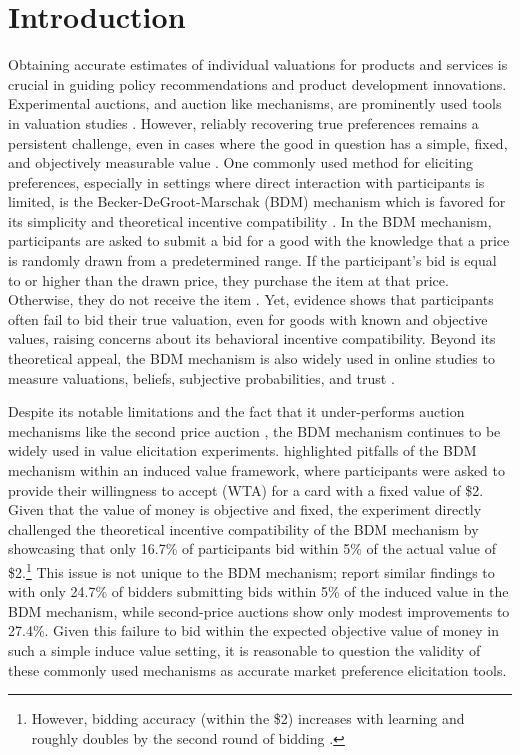 \documentclass[12pt]{article}
\begin{document}
\section{Introduction}
Obtaining accurate estimates of individual valuations for products and services is crucial in guiding policy recommendations and product development innovations. Experimental auctions, and auction like mechanisms, are prominently used tools in valuation studies \citep{lusk2007experimental,canavari2019run}. However, reliably recovering true preferences remains a persistent challenge, even in cases where the good in question has a simple, fixed, and objectively measurable value \citep{drichoutis2022game, cason_misconceptions_2014}. One commonly used method for eliciting preferences, especially in settings where direct interaction with participants is limited, is the Becker-DeGroot-Marschak (BDM) mechanism which is favored for its simplicity and theoretical incentive compatibility \citep{mamadehussene2023reliability, azrieli2018incentives}. In the BDM mechanism, participants are asked to submit a bid for a good with the knowledge that a price is randomly drawn from a predetermined range. If the participant's bid is equal to or higher than the drawn price, they purchase the item at that price. Otherwise, they do not receive the item \citep{becker_measuring_1964}. Yet, evidence shows that participants often fail to bid their true valuation, even for goods with known and objective values, raising concerns about its behavioral incentive compatibility. Beyond its theoretical appeal, the BDM mechanism is also widely used in online studies to measure valuations, beliefs, subjective probabilities, and trust  \citep{mamadehussene2023reliability, holt2009update, karni2009mechanism,shikuku2023endowments}. 

Despite its notable limitations and the fact that it under-performs auction mechanisms like the second price auction \citep{DrichoutisEtAl2024incentives}, the BDM mechanism continues to be widely used in value elicitation experiments. \citet{cason_misconceptions_2014} highlighted pitfalls of the BDM mechanism within an induced value framework, where participants were asked to provide their willingness to accept (WTA) for a card with a fixed value of \$2. Given that the value of money is objective and fixed, the experiment directly challenged the theoretical incentive compatibility of the BDM mechanism by showcasing that only 16.7\% of participants bid within 5\% of the actual value of \$2.\footnote{However, bidding accuracy (within the \$2) increases with learning and roughly doubles by the second round of bidding \cite{cason_misconceptions_2014}.} This issue is not unique to the BDM mechanism; \citet{DrichoutisEtAl2024incentives} report similar findings to \citet{cason_misconceptions_2014} with only 24.7\% of bidders submitting bids within 5\% of the induced value in the BDM mechanism, while second-price auctions show only modest improvements to 27.4\%. Given this failure to bid within the expected objective value of money in such a simple induce value setting, it is reasonable to question the validity of these commonly used mechanisms as accurate market preference elicitation tools. 
\end{document}

